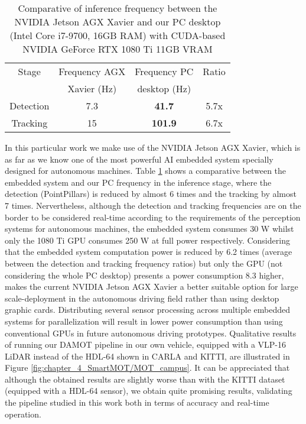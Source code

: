 \begin{table}[h]
	\caption{Comparative of inference frequency between the NVIDIA Jetson AGX Xavier and our PC desktop (Intel Core i7-9700, 16GB RAM) with CUDA-based NVIDIA GeForce RTX 1080 Ti 11GB VRAM}
	\label{table:xavier_vs_computer_hz}
	\begin{center}
		\begin{tabular}{ c | c c c}
			\toprule
			Stage & Frequency AGX &  Frequency PC & Ratio \\
			& Xavier (Hz) & desktop (Hz) & \\
			\midrule
			Detection & 7.3 & \bf{41.7} & 5.7x \\
			\hline
			Tracking & 15 & \bf{101.9} & 6.7x \\
			\bottomrule
		\end{tabular}
	\end{center}
\end{table}

In this particular work we make use of the NVIDIA Jetson AGX Xavier, which is as far as we know one of the most powerful AI embedded system specially designed for autonomous machines. Table \ref{table:xavier_vs_computer_hz} shows a comparative between the embedded system and our PC frequency in the inference stage, where the detection (PointPillars) is reduced by almost 6 times and the tracking by almost 7 times. Nervertheless, although the detection and tracking frequencies are on the border to be considered real-time according to the requirements of the perception systems for autonomous machines, the embedded system consumes 30 W whilst only the 1080 Ti GPU consumes 250 W at full power respectively. Considering that the embedded system computation power is reduced by 6.2 times (average between the detection and tracking frequency ratios) but only the GPU (not considering the whole PC desktop) presents a power consumption 8.3 higher, makes the current NVIDIA Jetson AGX Xavier a better suitable option for large scale-deployment in the autonomous driving field rather than using desktop graphic cards. Distributing several sensor processing across multiple embedded systems for parallelization will result in lower power consumption than using conventional GPUs in future autonomous driving prototypes. Qualitative results of running our DAMOT pipeline in our own vehicle, equipped with a VLP-16 LiDAR instead of the HDL-64 shown in CARLA and KITTI, are illustrated in Figure \ref{fig:chapter_4_SmartMOT/MOT_campus}. It can be appreciated that although the obtained results are slightly worse than with the KITTI dataset (equipped with a HDL-64 sensor), we obtain quite promising results, validating the pipeline studied in this work both in terms of accuracy and real-time operation.

